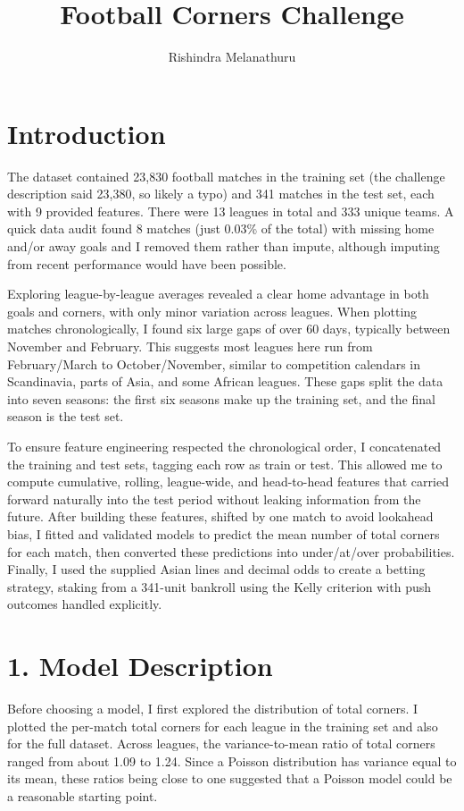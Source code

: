 \documentclass[12pt]{article}
\title{Football Corners Challenge}
\author{Rishindra Melanathuru}
\date{}
\begin{document}
\maketitle

\section*{Introduction}

The dataset contained 23{,}830 football matches in the training set (the challenge description said 23{,}380, so likely a  typo) and 341 matches in the test set, each with 9 provided features.  
There were 13 leagues in total and 333 unique teams. A quick data audit found 8 matches (just 0.03\% of the total) with missing home and/or away goals and I removed them rather than impute, although imputing from recent performance would have been possible.

Exploring league-by-league averages revealed a clear home advantage in both goals and corners, with only minor variation across leagues.  
When plotting matches chronologically, I found six large gaps of over 60 days, typically between November and February.  
This suggests most leagues here run from February/March to October/November, similar to competition calendars in Scandinavia, parts of Asia, and some African leagues.  
These gaps split the data into seven seasons: the first six seasons make up the training set, and the final season is the test set.

To ensure feature engineering respected the chronological order, I concatenated the training and test sets, tagging each row as train or test.  
This allowed me to compute cumulative, rolling, league-wide, and head-to-head features that carried forward naturally into the test period without leaking information from the future.  
After building these features, shifted by one match to avoid lookahead bias, I fitted and validated models to predict the mean number of total corners for each match, then converted these predictions into under/at/over probabilities.  
Finally, I used the supplied Asian lines and decimal odds to create a betting strategy, staking from a 341-unit bankroll using the Kelly criterion with push outcomes handled explicitly.

\section*{1. Model Description}

Before choosing a model, I first explored the distribution of total corners.  
I plotted the per-match total corners for each league in the training set and also for the full dataset.  
Across leagues, the variance-to-mean ratio of total corners ranged from about 1.09 to 1.24.  
Since a Poisson distribution has variance equal to its mean, these ratios being close to one suggested that a Poisson model could be a reasonable starting point.
\end{document}
